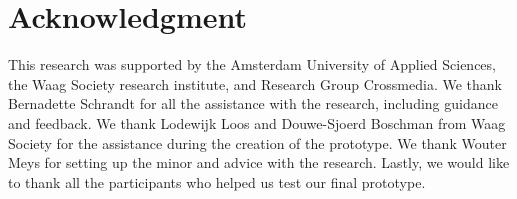 \documentclass[sigconf]{acmart}
\begin{document}

\section{Acknowledgment}
This research was supported by the Amsterdam University of Applied Sciences, the Waag Society research
institute, and Research Group Crossmedia. We thank Bernadette Schrandt for all the assistance
with the research, including guidance and feedback. We thank Lodewijk Loos and Douwe-Sjoerd Boschman
from Waag Society for the assistance during the creation of the prototype. We thank Wouter Meys for setting
up the minor and advice with the research. Lastly, we would like to thank all the participants who helped
us test our final prototype.





\end{document}
